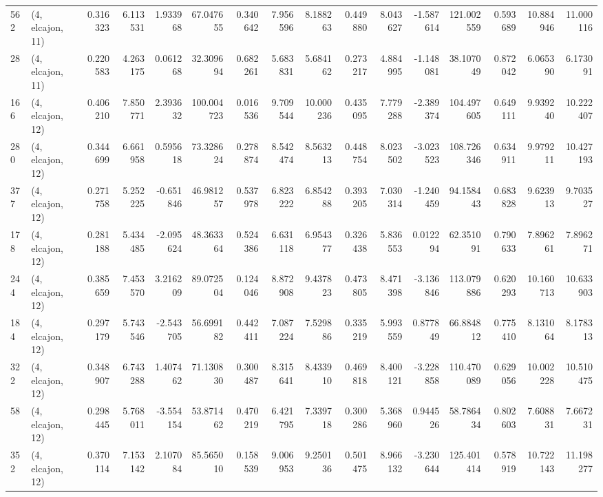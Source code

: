 \begin{tabular}{llrrrrrrrrrrrrrr}
562 &  (4, elcajon, 11) &   0.316323 &   6.113531 &   1.933968 &    67.047655 &   0.340642 &   7.956596 &   8.188263 &  0.449880 &   8.043627 &  -1.587614 &   121.002559 &  0.593689 &  10.884946 &  11.000116 \\
28  &  (4, elcajon, 11) &   0.220583 &   4.263175 &   0.061268 &    32.309694 &   0.682261 &   5.683831 &   5.684162 &  0.273217 &   4.884995 &  -1.148081 &    38.107049 &  0.872042 &   6.065390 &   6.173091 \\
166 &  (4, elcajon, 12) &   0.406210 &   7.850771 &   2.393632 &   100.004723 &   0.016536 &   9.709544 &  10.000236 &  0.435095 &   7.779288 &  -2.389374 &   104.497605 &  0.649111 &   9.939240 &  10.222407 \\
280 &  (4, elcajon, 12) &   0.344699 &   6.661958 &   0.595618 &    73.328624 &   0.278874 &   8.542474 &   8.563213 &  0.448754 &   8.023502 &  -3.023523 &   108.726346 &  0.634911 &   9.979211 &  10.427193 \\
377 &  (4, elcajon, 12) &   0.271758 &   5.252225 &  -0.651846 &    46.981257 &   0.537978 &   6.823222 &   6.854288 &  0.393205 &   7.030314 &  -1.240459 &    94.158443 &  0.683828 &   9.623913 &   9.703527 \\
178 &  (4, elcajon, 12) &   0.281188 &   5.434485 &  -2.095624 &    48.363364 &   0.524386 &   6.631118 &   6.954377 &  0.326438 &   5.836553 &   0.012294 &    62.351091 &  0.790633 &   7.896261 &   7.896271 \\
244 &  (4, elcajon, 12) &   0.385659 &   7.453570 &   3.216209 &    89.072504 &   0.124046 &   8.872908 &   9.437823 &  0.473805 &   8.471398 &  -3.136846 &   113.079886 &  0.620293 &  10.160713 &  10.633903 \\
184 &  (4, elcajon, 12) &   0.297179 &   5.743546 &  -2.543705 &    56.699182 &   0.442411 &   7.087224 &   7.529886 &  0.335219 &   5.993559 &   0.877849 &    66.884812 &  0.775410 &   8.131064 &   8.178313 \\
322 &  (4, elcajon, 12) &   0.348907 &   6.743288 &   1.407462 &    71.130830 &   0.300487 &   8.315641 &   8.433910 &  0.469818 &   8.400121 &  -3.228858 &   110.470089 &  0.629056 &  10.002228 &  10.510475 \\
58  &  (4, elcajon, 12) &   0.298445 &   5.768011 &  -3.554154 &    53.871462 &   0.470219 &   6.421795 &   7.339718 &  0.300286 &   5.368960 &   0.944526 &    58.786434 &  0.802603 &   7.608831 &   7.667231 \\
352 &  (4, elcajon, 12) &   0.370114 &   7.153142 &   2.107084 &    85.565010 &   0.158539 &   9.006953 &   9.250136 &  0.501475 &   8.966132 &  -3.230644 &   125.401414 &  0.578919 &  10.722143 &  11.198277 \\

\end{tabular}

